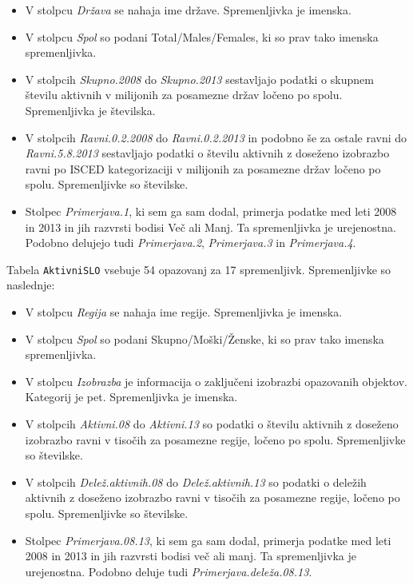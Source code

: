 \documentclass[11pt,a4paper]{article}
\begin{document}
\begin{itemize}
  \item V stolpcu \textit{Država} se nahaja ime države. Spremenljivka je imenska.
  \item V stolpcu \textit{Spol} so podani Total/Males/Females, ki so prav tako imenska spremenljivka.
  \item V stolpcih \textit{Skupno.2008} do \textit{Skupno.2013} sestavljajo podatki o skupnem številu aktivnih v milijonih  za posamezne držav ločeno po spolu. Spremenljivka je številska.
  \item V stolpcih \textit{Ravni.0.2.2008} do \textit{Ravni.0.2.2013} in podobno še za ostale ravni do \textit{Ravni.5.8.2013} sestavljajo podatki o številu aktivnih z doseženo izobrazbo ravni po ISCED kategorizaciji v milijonih za posamezne držav ločeno po spolu. Spremenljivke so številske.  
  \item Stolpec \textit{Primerjava.1}, ki sem ga sam dodal, primerja podatke med leti 2008 in 2013 in jih razvrsti bodisi Več ali Manj. Ta spremenljivka je urejenostna. Podobno delujejo tudi \textit{Primerjava.2}, \textit{Primerjava.3} in \textit{Primerjava.4}.
\end{itemize}

Tabela \verb|AktivniSLO| vsebuje 54 opazovanj za 17 spremenljivk. Spremenljivke so naslednje:

\begin{itemize}
  \item V stolpcu \textit{Regija} se nahaja ime regije. Spremenljivka je imenska.
  \item V stolpcu \textit{Spol} so podani Skupno/Moški/Ženske, ki so prav tako imenska spremenljivka.
  \item V stolpcu \textit{Izobrazba} je informacija o zaključeni izobrazbi opazovanih objektov. Kategorij je pet. Spremenljivka je imenska.
  \item V stolpcih \textit{Aktivni.08} do \textit{Aktivni.13} so podatki o številu aktivnih z doseženo izobrazbo ravni v tisočih za posamezne regije, ločeno po spolu. Spremenljivke so številske.
   \item V stolpcih \textit{Delež.aktivnih.08} do \textit{Delež.aktivnih.13} so podatki o deležih aktivnih z doseženo izobrazbo ravni v tisočih za posamezne regije, ločeno po spolu. Spremenljivke so številske.
   \item Stolpec \textit{Primerjava.08.13}, ki sem ga sam dodal, primerja podatke med leti 2008 in 2013 in jih razvrsti bodisi več ali manj. Ta spremenljivka je urejenostna. Podobno deluje tudi \textit{Primerjava.deleža.08.13}.
\end{itemize}
\end{document}

